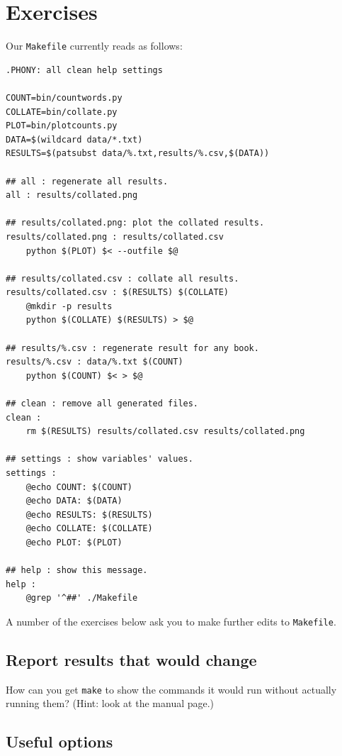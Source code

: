 \documentclass[
]{krantz}
\begin{document}
\hypertarget{automate-exercises}{%
\section{Exercises}\label{automate-exercises}}

Our \texttt{Makefile} currently reads as follows:

\begin{verbatim}
.PHONY: all clean help settings

COUNT=bin/countwords.py
COLLATE=bin/collate.py
PLOT=bin/plotcounts.py
DATA=$(wildcard data/*.txt)
RESULTS=$(patsubst data/%.txt,results/%.csv,$(DATA))

## all : regenerate all results.
all : results/collated.png

## results/collated.png: plot the collated results.
results/collated.png : results/collated.csv
    python $(PLOT) $< --outfile $@

## results/collated.csv : collate all results.
results/collated.csv : $(RESULTS) $(COLLATE)
    @mkdir -p results
    python $(COLLATE) $(RESULTS) > $@

## results/%.csv : regenerate result for any book.
results/%.csv : data/%.txt $(COUNT)
    python $(COUNT) $< > $@

## clean : remove all generated files.
clean :
    rm $(RESULTS) results/collated.csv results/collated.png

## settings : show variables' values.
settings :
    @echo COUNT: $(COUNT)
    @echo DATA: $(DATA)
    @echo RESULTS: $(RESULTS)
    @echo COLLATE: $(COLLATE)
    @echo PLOT: $(PLOT)

## help : show this message.
help :
    @grep '^##' ./Makefile
\end{verbatim}

A number of the exercises below ask you to make further edits to \texttt{Makefile}.

\hypertarget{automate-ex-report-change}{%
\subsection{Report results that would change}\label{automate-ex-report-change}}

How can you get \texttt{make} to show the commands it would run
without actually running them?
(Hint: look at the manual page.)

\hypertarget{automate-ex-useful-options}{%
\subsection{Useful options}\label{automate-ex-useful-options}}
\end{document}
